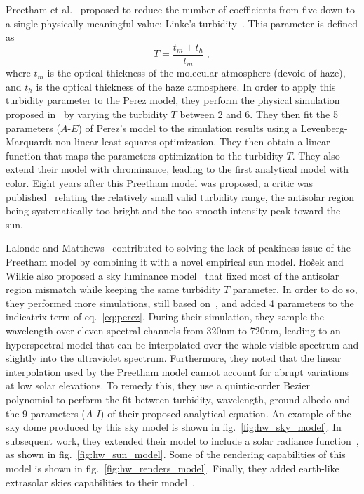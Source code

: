 Preetham et al.~\cite{preetham-siggraph-99} proposed to reduce the number of coefficients from five down to a single physically meaningful value: Linke's turbidity~\cite{mccartney1976optics}. This parameter is defined as
\begin{equation}
T = \frac{t_m + t_h}{t_m} \;,
\end{equation}
where $t_m$ is the optical thickness of the molecular atmosphere (devoid of haze), and $t_h$ is the optical thickness of the haze atmosphere. In order to apply this turbidity parameter to the Perez model, they perform the physical simulation proposed in~\cite{nishita1996display} by varying the turbidity $T$ between 2 and 6. They then fit the 5 parameters ($A$-$E$) of Perez's model to the simulation results using a Levenberg-Marquardt non-linear least squares optimization. They then obtain a linear function that maps the parameters optimization to the turbidity $T$. They also extend their model with chrominance, leading to the first analytical model with color. 
Eight years after this Preetham model was proposed, a critic was published~\cite{zotti2007critical} relating the relatively small valid turbidity range, the antisolar region being systematically too bright and the too smooth intensity peak toward the sun.

Lalonde and Matthews~\cite{lalonde-3dv-14} contributed to solving the lack of peakiness issue of the Preetham model by combining it with a novel empirical sun model. Ho\v{s}ek and Wilkie also proposed a sky luminance model~\cite{hosek-siggraph-12} that fixed most of the antisolar region mismatch while keeping the same turbidity $T$ parameter. In order to do so, they performed more simulations, still based on~\cite{nishita1996display}, and added 4 parameters to the indicatrix term of eq.~\eqref{eq:perez}. During their simulation, they sample the wavelength over eleven spectral channels from 320nm to 720nm, leading to an hyperspectral model that can be interpolated over the whole visible spectrum and slightly into the ultraviolet spectrum. Furthermore, they noted that the linear interpolation used by the Preetham model cannot account for abrupt variations at low solar elevations. To remedy this, they use a quintic-order Bezier polynomial to perform the fit between turbidity, wavelength, ground albedo and the 9 parameters ($A$-$I$) of their proposed analytical equation. An example of the sky dome produced by this sky model is shown in fig.~\ref{fig:hw_sky_model}. In subsequent work, they extended their model to include a solar radiance function~\cite{hosek-cga-13}, as shown in fig.~\ref{fig:hw_sun_model}. Some of the rendering capabilities of this model is shown in fig.~\ref{fig:hw_renders_model}. Finally, they added earth-like extrasolar skies capabilities to their model~\cite{wilkie2013predicting}.



